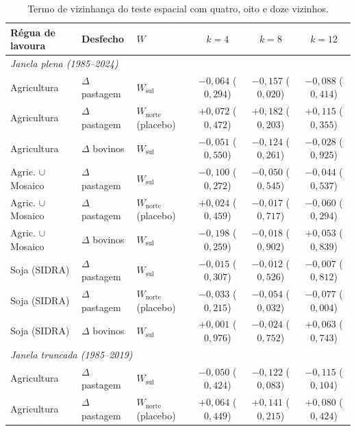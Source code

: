 \begin{table}[!ht]
\centering
\caption[Sensibilidade do termo de vizinhança à matriz]{Termo de vizinhança do teste espacial com quatro, oito e doze vizinhos.}
\label{tab:slx-w}
\footnotesize
\begin{tabular}{lllccc}
\toprule
\textbf{Régua de lavoura} & \textbf{Desfecho} & \textbf{$W$} & \textbf{$k = 4$} & \textbf{$k = 8$} & \textbf{$k = 12$} \\
\midrule
\multicolumn{6}{l}{\textit{Janela plena (1985--2024)}} \\
Agricultura & $\Delta$ pastagem & $W_{\mathrm{sul}}$ & $-0{,}064$ ($0{,}294$) & $-0{,}157$ ($0{,}020$) & $-0{,}088$ ($0{,}414$) \\
Agricultura & $\Delta$ pastagem & $W_{\mathrm{norte}}$ (placebo) & $+0{,}072$ ($0{,}472$) & $+0{,}182$ ($0{,}203$) & $+0{,}115$ ($0{,}355$) \\
Agricultura & $\Delta$ bovinos & $W_{\mathrm{sul}}$ & $-0{,}051$ ($0{,}550$) & $-0{,}124$ ($0{,}261$) & $-0{,}028$ ($0{,}925$) \\
Agric. $\cup$ Mosaico & $\Delta$ pastagem & $W_{\mathrm{sul}}$ & $-0{,}100$ ($0{,}272$) & $-0{,}050$ ($0{,}545$) & $-0{,}044$ ($0{,}537$) \\
Agric. $\cup$ Mosaico & $\Delta$ pastagem & $W_{\mathrm{norte}}$ (placebo) & $+0{,}024$ ($0{,}459$) & $-0{,}017$ ($0{,}717$) & $-0{,}060$ ($0{,}294$) \\
Agric. $\cup$ Mosaico & $\Delta$ bovinos & $W_{\mathrm{sul}}$ & $-0{,}198$ ($0{,}259$) & $-0{,}018$ ($0{,}902$) & $+0{,}053$ ($0{,}839$) \\
Soja (SIDRA) & $\Delta$ pastagem & $W_{\mathrm{sul}}$ & $-0{,}015$ ($0{,}307$) & $-0{,}012$ ($0{,}526$) & $-0{,}007$ ($0{,}812$) \\
Soja (SIDRA) & $\Delta$ pastagem & $W_{\mathrm{norte}}$ (placebo) & $-0{,}033$ ($0{,}215$) & $-0{,}054$ ($0{,}032$) & $-0{,}077$ ($0{,}004$) \\
Soja (SIDRA) & $\Delta$ bovinos & $W_{\mathrm{sul}}$ & $+0{,}001$ ($0{,}976$) & $-0{,}024$ ($0{,}752$) & $+0{,}063$ ($0{,}743$) \\
\multicolumn{6}{l}{\textit{Janela truncada (1985--2019)}} \\
Agricultura & $\Delta$ pastagem & $W_{\mathrm{sul}}$ & $-0{,}050$ ($0{,}424$) & $-0{,}122$ ($0{,}083$) & $-0{,}115$ ($0{,}104$) \\
Agricultura & $\Delta$ pastagem & $W_{\mathrm{norte}}$ (placebo) & $+0{,}064$ ($0{,}449$) & $+0{,}141$ ($0{,}215$) & $+0{,}080$ ($0{,}424$) \\

\end{tabular}
\end{table}
